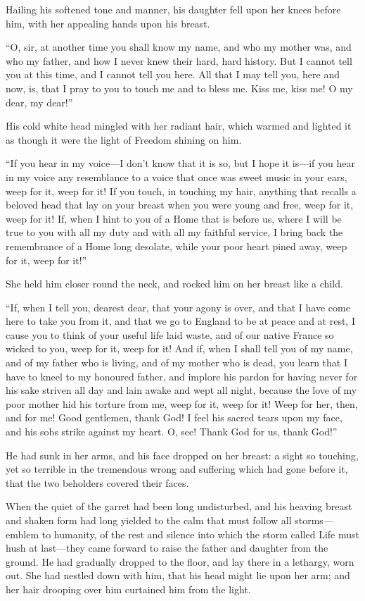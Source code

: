 Hailing his softened tone and manner, his daughter fell upon her
knees before him, with her appealing hands upon his breast.

``O, sir, at another time you shall know my name, and who my mother
was, and who my father, and how I never knew their hard, hard
history.  But I cannot tell you at this time, and I cannot tell you
here.  All that I may tell you, here and now, is, that I pray to you
to touch me and to bless me. Kiss me, kiss me!  O my dear, my dear!''

His cold white head mingled with her radiant hair, which warmed and
lighted it as though it were the light of Freedom shining on him.

``If you hear in my voice---I don't know that it is so, but I hope it
is---if you hear in my voice any resemblance to a voice that once was
sweet music in your ears, weep for it, weep for it!  If you touch,
in touching my hair, anything that recalls a beloved head that lay on
your breast when you were young and free, weep for it, weep for it!
If, when I hint to you of a Home that is before us, where I will be
true to you with all my duty and with all my faithful service, I
bring back the remembrance of a Home long desolate, while your poor
heart pined away, weep for it, weep for it!''

She held him closer round the neck, and rocked him on her breast
like a child.

``If, when I tell you, dearest dear, that your agony is over, and that
I have come here to take you from it, and that we go to England to be
at peace and at rest, I cause you to think of your useful life laid
waste, and of our native France so wicked to you, weep for it, weep
for it!  And if, when I shall tell you of my name, and of my father
who is living, and of my mother who is dead, you learn that I have to
kneel to my honoured father, and implore his pardon for having never
for his sake striven all day and lain awake and wept all night,
because the love of my poor mother hid his torture from me, weep for
it, weep for it!  Weep for her, then, and for me!  Good gentlemen,
thank God!  I feel his sacred tears upon my face, and his sobs strike
against my heart. O, see!  Thank God for us, thank God!''

He had sunk in her arms, and his face dropped on her breast:  a sight
so touching, yet so terrible in the tremendous wrong and suffering
which had gone before it, that the two beholders covered their faces.

When the quiet of the garret had been long undisturbed, and his
heaving breast and shaken form had long yielded to the calm that must
follow all storms---emblem to humanity, of the rest and silence into
which the storm called Life must hush at last---they came forward to
raise the father and daughter from the ground.  He had gradually
dropped to the floor, and lay there in a lethargy, worn out.  She had
nestled down with him, that his head might lie upon her arm; and her
hair drooping over him curtained him from the light.

